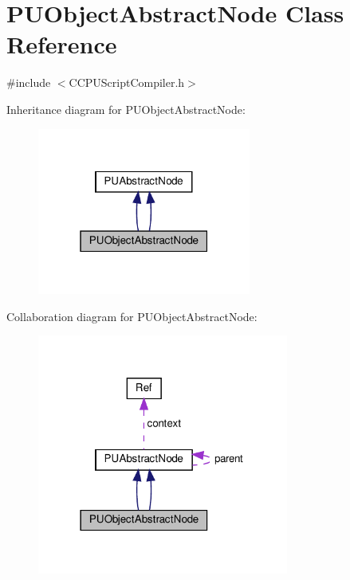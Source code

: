 \hypertarget{classPUObjectAbstractNode}{}\section{P\+U\+Object\+Abstract\+Node Class Reference}
\label{classPUObjectAbstractNode}


{\ttfamily \#include $<$C\+C\+P\+U\+Script\+Compiler.\+h$>$}



Inheritance diagram for P\+U\+Object\+Abstract\+Node\+:
\nopagebreak
\begin{figure}[H]
\begin{center}
\leavevmode
\includegraphics[width=199pt]{classPUObjectAbstractNode__inherit__graph}
\end{center}
\end{figure}


Collaboration diagram for P\+U\+Object\+Abstract\+Node\+:
\nopagebreak
\begin{figure}[H]
\begin{center}
\leavevmode
\includegraphics[width=234pt]{classPUObjectAbstractNode__coll__graph}
\end{center}
\end{figure}
